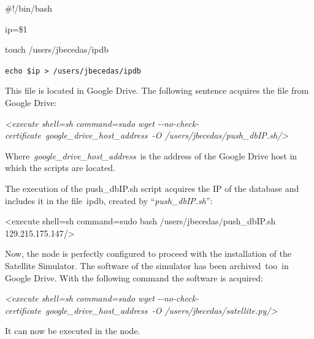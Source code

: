 \documentclass[a4paper]{article}
\begin{document}
\bigskip

{\ttfamily
\#!/bin/bash}


\bigskip

{\ttfamily
ip=\$1}


\bigskip

{\ttfamily
touch /users/jbecedas/ipdb}

\texttt{echo \$ip {\textgreater} /users/jbecedas/ipdb}


\bigskip

This file is located in Google Drive. The following sentence acquires
the file from Google Drive:


\bigskip

\textit{{\textless}execute shell={\textquotedbl}sh{\textquotedbl}
command={\textquotedbl}sudo wget
-{}-no-check-certificate\ }\textit{\textcolor[rgb]{0.7529412,0.0,0.0}{google\_drive\_host\_address}}\textit{\ }\textit{{}-O
/users/jbecedas/push\_dbIP.sh{\textquotedbl}/{\textgreater}}


\bigskip

Where\ \textit{\textcolor[rgb]{0.7529412,0.0,0.0}{google\_drive\_host\_address}}\textit{\textcolor[rgb]{0.7529412,0.0,0.0}{\ }}is
the address of the Google Drive host in which the scripts are located.


\bigskip

The execution of the push\_dbIP.sh script acquires the IP of the
database and includes it in the file\ ipdb, created by
{\textquotedblleft}\textit{push\_dbIP.sh}{\textquotedblright}:

{\textless}execute shell={\textquotedbl}sh{\textquotedbl}
command={\textquotedbl}sudo bash /users/jbecedas/push\_dbIP.sh
129.215.175.147{\textquotedbl}/{\textgreater}


\bigskip

Now, the node is perfectly configured to proceed with the installation
of the Satellite Simulator. The software of the simulator has been
archived\ too\ in Google Drive. With the following command the software
is acquired:


\bigskip

\textit{{\textless}execute shell={\textquotedbl}sh{\textquotedbl}
command={\textquotedbl}sudo wget
-{}-no-check-certificate\ }\textit{\textcolor[rgb]{0.7529412,0.0,0.0}{google\_drive\_host\_address}}\textit{\ }\textit{{}-O
/users/jbecedas/satellite.py{\textquotedbl}/{\textgreater}}


\bigskip

It can now be executed in the node.
\end{document}
